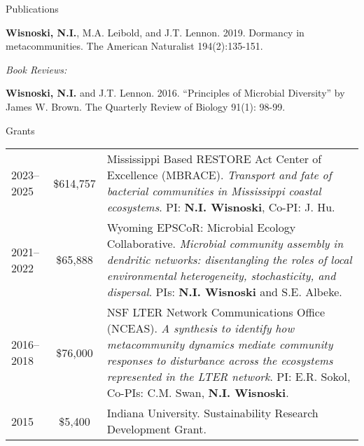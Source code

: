 \documentclass{resume} %
\begin{document}
\begin{rSection}{Publications}
\begin{etaremune}
\item {\bf Wisnoski, N.I.}, M.A. Leibold, and J.T. Lennon. 2019. Dormancy in metacommunities. The American Naturalist 194(2):135-151.

\end{etaremune}

\bigskip

{\it Book Reviews:}
\begin{etaremune}
\item {\bf Wisnoski, N.I.} and J.T. Lennon. 2016. \enquote{Principles of Microbial Diversity} by James W. Brown. The Quarterly Review of Biology 91(1): 98-99.

\end{etaremune}
\end{rSection}

\bigskip

\newpage
\begin{rSection}{Grants}
{\def\arraystretch{1.5}
\begin{tabulary}{0.95\textwidth}{lcL}
2023--2025 & \$614,757 & Mississippi Based RESTORE Act Center of Excellence (MBRACE). \textit{Transport and fate of bacterial communities in Mississippi coastal ecosystems}. PI: {\bf N.I. Wisnoski}, Co-PI: J. Hu. \\

2021--2022 & \$65,888 & Wyoming EPSCoR: Microbial Ecology Collaborative. \textit{Microbial community assembly in dendritic networks: disentangling the roles of local environmental heterogeneity, stochasticity, and dispersal}. PIs: {\bf N.I. Wisnoski} and S.E. Albeke.\\

2016--2018 & \$76,000 & NSF LTER Network Communications Office (NCEAS). \textit{A synthesis to identify how metacommunity dynamics mediate community responses to disturbance across the ecosystems represented in the LTER network}. PI: E.R. Sokol, Co-PIs: C.M. Swan, {\bf N.I. Wisnoski}.\\

2015 & \$5,400 & Indiana University. Sustainability Research Development Grant.

\end{tabulary}
}
\end{rSection}

\bigskip
\end{document}
